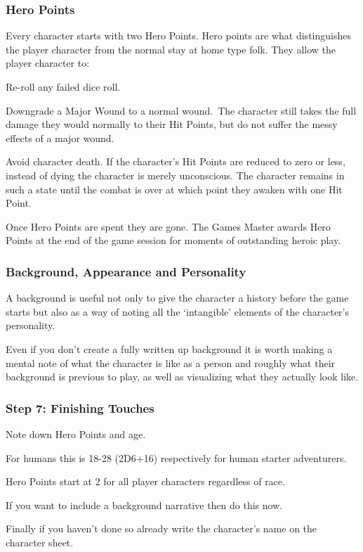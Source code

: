 \subsubsection{Hero Points}
Every character starts with two Hero Points. Hero points are what distinguishes the player character from the normal stay at home type folk. They allow the player character to:

\begin{rpg-list}
	\item Re-roll any failed dice roll.
	\item Downgrade a Major Wound to a normal wound. The character still takes the full damage they would normally to their Hit Points, but do not suffer the messy effects of a major wound.
	\item Avoid character death. If the character’s Hit Points are reduced to zero or less, instead of dying the character is merely unconscious. The character remains in such a state until the combat is over at which point they awaken with one Hit Point.
\end{rpg-list}

Once Hero Points are spent they are gone. The Games Master awards Hero Points at the end of the game session for moments of outstanding heroic play.

\subsubsection{Background, Appearance and Personality}
A background is useful not only to give the character a history before the game starts but also as a way of noting all the ‘intangible’ elements of the character’s personality. 

Even if you don’t create a fully written up background it is worth making a mental note of what the character is like as a person and roughly what their background is previous to play, as well as visualizing what they actually look like. 

\subsubsection{Step 7: Finishing Touches}
Note down Hero Points and age.

For humans this is 18-28 (2D6+16) respectively for human starter adventurers.

Hero Points start at 2 for all player characters regardless of race.

If you want to include a background narrative then do this now.

Finally if you haven’t done so already write the character’s name on the character sheet.

